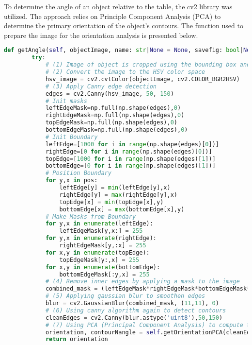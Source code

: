 To determine the angle of an object relative to the table, the cv2 library was utilized. The approach relies on Principle Component Analysis (PCA) to determine the primary orientation of the object's contours. The function used to prepare the image for the orientation analysis is presented below.

\begin{lstlisting}[language=python]
def getAngle(self, objectImage, name: str|None = None, savefig: bool|None = None) -> float:
        try:
            # (1) Image of object is cropped using the bounding box and passed as a parameter
            # (2) Convert the image to the HSV color space
            hsv_image = cv2.cvtColor(objectImage, cv2.COLOR_BGR2HSV)
            # (3) Apply Canny edge detection
            edges = cv2.Canny(hsv_image, 50, 150)
            # Init masks
            leftEdgeMask=np.full(np.shape(edges),0)
            rightEdgeMask=np.full(np.shape(edges),0)
            topEdgeMask=np.full(np.shape(edges),0)
            bottomEdgeMask=np.full(np.shape(edges),0)
            # Init Boundary
            leftEdge=[1000 for i in range(np.shape(edges)[0])]
            rightEdge=[0 for i in range(np.shape(edges)[0])]
            topEdge=[1000 for i in range(np.shape(edges)[1])]
            bottomEdge=[0 for i in range(np.shape(edges)[1])]
            # Position Boundary
            for y,x in pos:
                leftEdge[y] = min(leftEdge[y],x)
                rightEdge[y] = max(rightEdge[y],x)
                topEdge[x] = min(topEdge[x],y)
                bottomEdge[x] = max(bottomEdge[x],y)
            # Make Masks from Boundary
            for y,x in enumerate(leftEdge):
                leftEdgeMask[y,x:] = 255
            for y,x in enumerate(rightEdge):
                rightEdgeMask[y,:x] = 255
            for x,y in enumerate(topEdge):
                topEdgeMask[y:,x] = 255
            for x,y in enumerate(bottomEdge):
                bottomEdgeMask[:y,x] = 255
            # (4) Remove inner edges by applying a mask to the image
            combined_mask = (leftEdgeMask*rightEdgeMask*bottomEdgeMask*topEdgeMask/255**3)
            # (5) Applying gaussian blur to smoothen edges
            blur = cv2.GaussianBlur(combined_mask, (11,11), 0)
            # (6) Using canny algorithm again to detect contours
            cleanEdges = cv2.Canny(blur.astype('uint8'),50,150)
            # (7) Using PCA (Principal Component Analysis) to compute the main orientation of the object
            orientation, contourNangle = self.getOrientationPCA(cleanEdges,objectImage)
            return orientation
\end{lstlisting}

